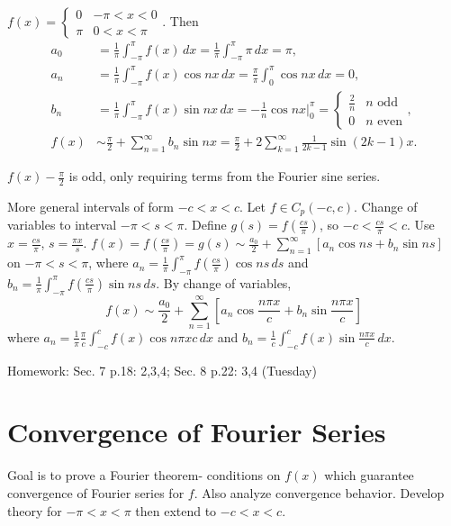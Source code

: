\documentclass[]{article}
\begin{document}
\begin{example}
	$f(x) = \begin{cases} 0 & -\pi<x<0 \\ \pi & 0<x<\pi \end{cases}$. Then	\begin{align*}a_0 &= \frac{1}{\pi} \int_{-\pi}^\pi f(x) \, dx = \frac{1}{\pi} \int_{-\pi}^\pi \pi \, dx = \pi, \\
	a_n &= \frac{1}{\pi} \int_{-\pi}^\pi f(x) \cos{nx} \, dx = \frac{\pi}{\pi} \int_0^\pi \cos{nx}\, dx = 0, \\
	b_n &= \frac{1}{\pi} \int_{-\pi}^\pi f(x) \sin{nx} \, dx = - \frac{1}{n} \cos{nx} \big\rvert_0^\pi = \begin{cases} \frac{2}{n} & n \text{ odd} \\ 0 & n \text{ even} \end{cases}, \\
	f(x) &\sim \frac{\pi}{2} + \sum_{n=1}^\infty b_n \sin{nx} = \frac{\pi}{2} + 2\sum_{k=1}^\infty \frac{1}{2k-1} \sin{(2k-1)x} .
	\end{align*}
	\begin{note}
		$f(x) - \frac{\pi}{2}$ is odd, only requiring terms from the Fourier sine series.
	\end{note}
\end{example}

More general intervals of form $-c<x<c$.
Let $f\in C_p(-c,c)$. Change of variables to interval $-\pi < s <\pi$.
Define $g(s) = f(\frac{cs}{\pi})$, so $-c<\frac{cs}{\pi}<c$. Use $x=\frac{cs}{\pi}$, $s=\frac{\pi x}{s}$.
$f(x) = f(\frac{cs}{\pi}) = g(s) \sim \frac{a_0}{2} + \sum_{n=1}^\infty \left[ a_n \cos{ns} + b_n \sin{ns} \right]$ on $-\pi < s< \pi$, where $a_n = \frac{1}{\pi} \int_{-\pi}^\pi f(\frac{cs}{\pi}) \cos{ns} \, ds$ and $b_n = \frac{1}{\pi} \int_{-\pi}^\pi f(\frac{cs}{\pi}) \sin{ns} \, ds$. By change of variables, $$ f(x) \sim \frac{a_0}{2} + \sum_{n=1}^\infty \left[ a_n \cos{\frac{n\pi x}{c}} + b_n \sin{\frac{n\pi x}{c}} \right]$$ where $a_n = \frac{1}{\pi} \frac{\pi}{c} \int_{-c}^c f(x) \cos{n\pi x}{c} \, dx$ and $b_n = \frac{1}{c} \int_{-c}^c f(x) \sin{\frac{n\pi x}{c}} \, dx$.

Homework: Sec. 7 p.18: 2,3,4; Sec. 8 p.22: 3,4 (Tuesday)

\section{Convergence of Fourier Series}

Goal is to prove a Fourier theorem-
conditions on $f(x)$ which guarantee convergence of Fourier series for $f$. 
Also analyze convergence behavior. Develop theory for $-\pi<x<\pi$ then extend to $-c<x<c$.
\end{document}
